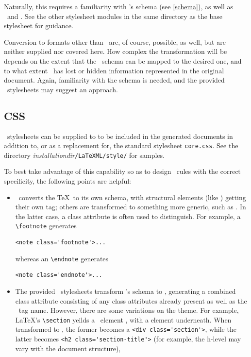 \documentclass{book}
\begin{document}
Naturally, this requires a familiarity with \LaTeXML's schema (see \ref{schema}),
as well as \XSLT\ and \XHTML.  See the other stylesheet modules in the same directory
as the base stylesheet for guidance.

Conversion to formats other than \XHTML\ are, of course, possible, as well,
but are neither supplied nor covered here.
How complex the transformation will be depends on the extent
that the \LaTeXML\ schema can be mapped to the desired one,
and to what extent \LaTeXML\ has lost or hidden information
represented in the original document.  Again, familiarity with the schema is needed,
and the provided \XHTML\ stylesheets may suggest an approach.

\subsection{CSS}\label{customization.latexmlpost.css}
\CSS\ stylesheets can be supplied to  to
be included in the generated documents in addition to, or as a
replacement for, the standard stylesheet \texttt{core.css}.
See the directory
\textit{installationdir}\texttt{/LaTeXML/style/}
for samples.

To best take advantage of this capability so as to design
\CSS\ rules with the correct specificity, the following points are helpful:
\begin{itemize}
\item \LaTeXML\ converts the \TeX\ to its own schema,
  with structural elements (like ) getting their own tag;
  others are transformed to something more generic, such as .
  In the latter case, a class attribute is often used to distinguish.
  For example, a \verb|\footnote| generates
\begin{lstlisting}[style=xml]
  <note class='footnote'>...
\end{lstlisting}
  whereas an \verb|\endnote| generates
\begin{lstlisting}[style=xml]
  <note class='endnote'>...
\end{lstlisting}
\item The provided \XSLT\ stylesheets transform \LaTeXML's schema to \XHTML,
  generating a combined class attribute consisting of any class attributes
  already present as well as the \LaTeXML\ tag name.
  However, there are some variations on the theme.
  For example, \LaTeX's \verb|\section| yeilds a \LaTeXML\ element ,
  with a  element underneath.  When transformed to
  \XHTML, the former becomes a \verb|<div class='section'>|,
  while the latter becomes \verb|<h2 class='section-title'>|
 (for example, the h-level may vary with the document structure),
\end{itemize}
\end{document}
